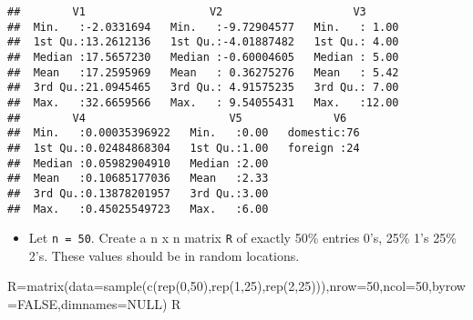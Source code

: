 \documentclass[
]{article}
\newenvironment{Shaded}{\begin{snugshade}}{\end{snugshade}}
\newcommand{\AttributeTok}[1]{\textcolor[rgb]{0.77,0.63,0.00}{#1}}
\newcommand{\ConstantTok}[1]{\textcolor[rgb]{0.00,0.00,0.00}{#1}}
\newcommand{\DecValTok}[1]{\textcolor[rgb]{0.00,0.00,0.81}{#1}}
\newcommand{\FunctionTok}[1]{\textcolor[rgb]{0.00,0.00,0.00}{#1}}
\newcommand{\NormalTok}[1]{#1}
\newcommand{\OtherTok}[1]{\textcolor[rgb]{0.56,0.35,0.01}{#1}}
\providecommand{\tightlist}{%
  \setlength{\itemsep}{0pt}\setlength{\parskip}{0pt}}
\begin{document}
\begin{verbatim}
##        V1                   V2                    V3       
##  Min.   :-2.0331694   Min.   :-9.72904577   Min.   : 1.00  
##  1st Qu.:13.2612136   1st Qu.:-4.01887482   1st Qu.: 4.00  
##  Median :17.5657230   Median :-0.60004605   Median : 5.00  
##  Mean   :17.2595969   Mean   : 0.36275276   Mean   : 5.42  
##  3rd Qu.:21.0945465   3rd Qu.: 4.91575235   3rd Qu.: 7.00  
##  Max.   :32.6659566   Max.   : 9.54055431   Max.   :12.00  
##        V4                      V5              V6    
##  Min.   :0.00035396922   Min.   :0.00   domestic:76  
##  1st Qu.:0.02484868304   1st Qu.:1.00   foreign :24  
##  Median :0.05982904910   Median :2.00                
##  Mean   :0.10685177036   Mean   :2.33                
##  3rd Qu.:0.13878201957   3rd Qu.:3.00                
##  Max.   :0.45025549723   Max.   :6.00
\end{verbatim}

\begin{itemize}
\tightlist
\item
  Let \texttt{n\ =\ 50}. Create a n x n matrix \texttt{R} of exactly
  50\% entries 0's, 25\% 1's 25\% 2's. These values should be in random
  locations.
\end{itemize}

\begin{Shaded}
\begin{Highlighting}[]
\NormalTok{R}\OtherTok{=}\FunctionTok{matrix}\NormalTok{(}\AttributeTok{data=}\FunctionTok{sample}\NormalTok{(}\FunctionTok{c}\NormalTok{(}\FunctionTok{rep}\NormalTok{(}\DecValTok{0}\NormalTok{,}\DecValTok{50}\NormalTok{),}\FunctionTok{rep}\NormalTok{(}\DecValTok{1}\NormalTok{,}\DecValTok{25}\NormalTok{),}\FunctionTok{rep}\NormalTok{(}\DecValTok{2}\NormalTok{,}\DecValTok{25}\NormalTok{))),}\AttributeTok{nrow=}\DecValTok{50}\NormalTok{,}\AttributeTok{ncol=}\DecValTok{50}\NormalTok{,}\AttributeTok{byrow=}\ConstantTok{FALSE}\NormalTok{,}\AttributeTok{dimnames=}\ConstantTok{NULL}\NormalTok{)}
\NormalTok{R}
\end{Highlighting}
\end{Shaded}
\end{document}
